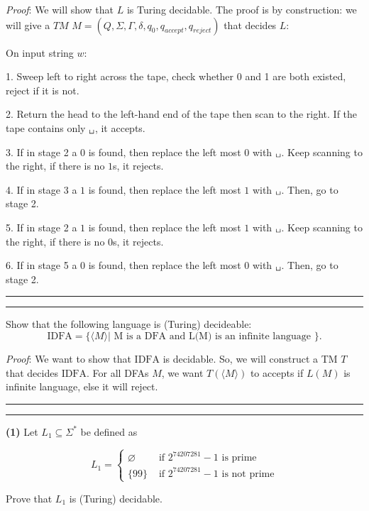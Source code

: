 \documentclass[a4paper, 11pt]{article}
\newcommand{\question}[2] {\vspace{.25in} \hrule\vspace{0.5em}
	\noindent{\bf #1: #2} \vspace{0.5em}
	\hrule \vspace{.10in}}
\renewcommand{\part}[1] {\vspace{.10in} {\bf (#1)}}
\begin{document}
	{\em Proof}: %
	We will show that $L$ is Turing decidable. The proof is by construction: we will give a $TM$ $M = (Q, \Sigma, \Gamma, \delta, q_0 , q_{accept} , q_{reject})$ that decides $L$:
	
	On input string $w$:
	
	1. Sweep left to right across the tape, check whether 0 and 1 are both existed, reject if it is not.
	
	2. Return the head to the left-hand end of the tape then scan to the right. If the tape contains only $\texttt{\char32}$, it accepts.
	
	3. If in stage 2 a $0$ is found, then replace the left most $0$ with $\texttt{\char32}$. Keep scanning to the right, if there is no $1$s, it rejects.
	
	4. If in stage 3 a $1$ is found, then replace the left most $1$ with $\texttt{\char32}$. Then, go to stage 2.
	
	5. If in stage 2 a $1$ is found, then replace the left most $1$ with $\texttt{\char32}$. Keep scanning to the right, if there is no $0$s, it rejects.
	
	6. If in stage 5 a $0$ is found, then replace the left most $0$ with $\texttt{\char32}$. Then, go to stage 2.
	
	\question{5}{Infinite DFA}
	
	Show that the following language is (Turing) decideable:
	$$ \text{IDFA} = \{\langle M \rangle| \text{ M is a DFA and L(M) is an infinite language  } \}.$$
	
	{\em Proof}: We want to show that $\text{IDFA}$ is decidable. So, we will construct a TM $T$ that decides $\text{IDFA}$. For all DFAs $M$, we want $T(\langle M \rangle)$ to accepts if $L(M)$ is infinite language, else it will reject. %
	
	\question{6}{Lucky 9}
	
	\part{1} Let $L_1 \subseteq \Sigma^*$ be defined as
	
	$$
	L_1 = \begin{cases} 
	\varnothing & \text{ if $2^{74207281}-1$ is prime} \\
	\{99\} & \text{ if $2^{74207281}-1$ is not prime}
	\end{cases}
	$$
	
	Prove that $L_1$ is (Turing) decidable.
	
\end{document}
